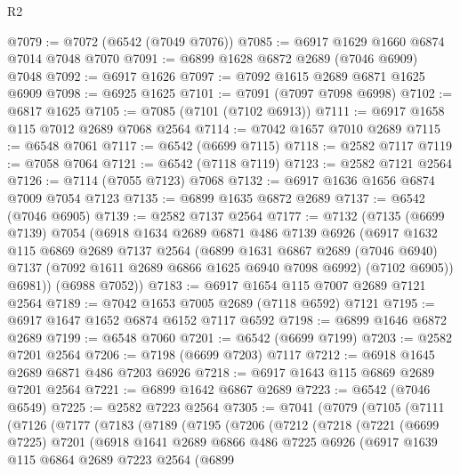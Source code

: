 \begin{lexlean}{R2}
\begin{coremodule}
@7079 := @7072 (@6542 (@7049 @7076))
@7085 := @6917 @1629 @1660 @6874 @7014 @7048 @7070
@7091 := @6899 @1628 @6872 @2689 (@7046 @6909) @7048
@7092 := @6917 @1626
@7097 := @7092 @1615 @2689 @6871 @1625 @6909
@7098 := @6925 @1625
@7101 := @7091 (@7097 @7098 @6998)
@7102 := @6817 @1625
@7105 := @7085 (@7101 (@7102 @6913))
@7111 := @6917 @1658 @115 @7012 @2689 @7068 @2564
@7114 := @7042 @1657 @7010 @2689
@7115 := @6548 @7061
@7117 := @6542 (@6699 @7115)
@7118 := @2582 @7117
@7119 := @7058 @7064
@7121 := @6542 (@7118 @7119)
@7123 := @2582 @7121 @2564
@7126 := @7114 (@7055 @7123) @7068
@7132 := @6917 @1636 @1656 @6874 @7009 @7054 @7123
@7135 := @6899 @1635 @6872 @2689
@7137 := @6542 (@7046 @6905)
@7139 := @2582 @7137 @2564
@7177 := @7132
    (@7135
      (@6699 @7139)
      @7054
      (@6918
        @1634
        @2689
        @6871
        @486
        @7139
        @6926
        (@6917
          @1632
          @115
          @6869
          @2689
          @7137
          @2564
          (@6899
            @1631
            @6867
            @2689
            (@7046 @6940)
            @7137
            (@7092 @1611 @2689 @6866 @1625 @6940 @7098 @6992)
            (@7102 @6905))
          @6981))
      (@6988 @7052))
@7183 := @6917 @1654 @115 @7007 @2689 @7121 @2564
@7189 := @7042 @1653 @7005 @2689 (@7118 @6592) @7121
@7195 := @6917 @1647 @1652 @6874 @6152 @7117 @6592
@7198 := @6899 @1646 @6872 @2689
@7199 := @6548 @7060
@7201 := @6542 (@6699 @7199)
@7203 := @2582 @7201 @2564
@7206 := @7198 (@6699 @7203) @7117
@7212 := @6918 @1645 @2689 @6871 @486 @7203 @6926
@7218 := @6917 @1643 @115 @6869 @2689 @7201 @2564
@7221 := @6899 @1642 @6867 @2689
@7223 := @6542 (@7046 @6549)
@7225 := @2582 @7223 @2564
@7305 := @7041
    (@7079
      (@7105
        (@7111
          (@7126
            (@7177
              (@7183
                (@7189
                  (@7195
                    (@7206
                      (@7212
                        (@7218
                          (@7221
                            (@6699 @7225)
                            @7201
                            (@6918
                              @1641
                              @2689
                              @6866
                              @486
                              @7225
                              @6926
                              (@6917
                                @1639
                                @115
                                @6864
                                @2689
                                @7223
                                @2564
                                (@6899

\end{coremodule}
\end{lexlean}
